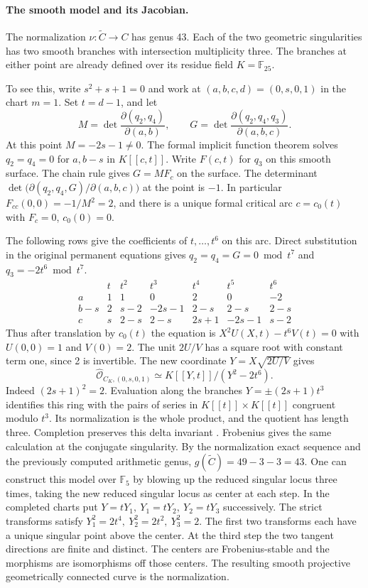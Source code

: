 \paragraph{The smooth model and its Jacobian.}
The normalization \(\nu:\widetilde C\to C\) has genus 43. Each of the
two geometric singularities has two smooth branches with intersection
multiplicity three. The branches at either point are already defined
over its residue field \(K=\mathbb F_{25}\).

To see this, write \(s^2+s+1=0\) and work at
\((a,b,c,d)=(0,s,0,1)\) in the chart \(m=1\). Set \(t=d-1\), and let
\[
 M=\det\frac{\partial(q_2,q_4)}{\partial(a,b)},\qquad
 G=\det\frac{\partial(q_2,q_4,q_3)}{\partial(a,b,c)}.
\]
At this point \(M=-2s-1\ne0\). The formal implicit function theorem
solves \(q_2=q_4=0\) for \(a,b-s\) in \(K[[c,t]]\). Write \(F(c,t)\)
for \(q_3\) on this smooth surface. The chain rule gives \(G=M F_c\)
on the surface. The determinant
\(\det\bigl(\partial(q_2,q_4,G)/\partial(a,b,c)\bigr)\) at the point
is \(-1\). In particular \(F_{cc}(0,0)=-1/M^2=2\), and there is a
unique formal critical arc \(c=c_0(t)\) with \(F_c=0\), \(c_0(0)=0\).

The following rows give the coefficients of \(t,\ldots,t^6\) on this
arc. Direct substitution in the original permanent equations gives
\(q_2=q_4=G=0\bmod t^7\) and \(q_3=-2t^6\bmod t^7\).
\[
\begin{array}{c|rrrrrr}
 & t&t^2&t^3&t^4&t^5&t^6\\ \hline
 a   &1&1&0&2&0&-2\\
 b-s &2&s-2&-2s-1&2-s&2-s&2-s\\
 c   &s&2-s&2-s&2s+1&-2s-1&s-2
\end{array}
\]
Thus after translation by \(c_0(t)\) the equation is
\(X^2U(X,t)-t^6 V(t)=0\) with \(U(0,0)=1\) and \(V(0)=2\).
The unit \(2U/V\) has a square root with constant term one, since
2 is invertible. The new coordinate \(Y=X\sqrt{2U/V}\) gives
\[
        \widehat{\mathcal O}_{C_K,(0,s,0,1)}
                   \simeq K[[Y,t]]/(Y^2-2t^6).
\]
Indeed \((2s+1)^2=2\). Evaluation along the branches
\(Y=\pm(2s+1)t^3\) identifies this ring with the pairs of series in
\(K[[t]]\times K[[t]]\) congruent modulo \(t^3\). Its normalization
is the whole product, and the quotient has length three. Completion
preserves this delta invariant \cite{stacksDeltaCompletion}. Frobenius
gives the same calculation at the conjugate singularity. By the
normalization exact sequence and the previously computed arithmetic
genus, \(g(\widetilde C)=49-3-3=43\). One can construct this model over \(\mathbb F_5\) by blowing up the
reduced singular locus three times, taking the new reduced singular
locus as center at each step. In the completed charts put
\(Y=tY_1,\ Y_1=tY_2,\ Y_2=tY_3\) successively. The strict transforms
satisfy \(Y_1^2=2t^4,\ Y_2^2=2t^2,\ Y_3^2=2\). The first two transforms
each have a unique singular point above the center. At the third step
the two tangent directions are finite and distinct. The centers are
Frobenius-stable and the morphisms are isomorphisms off those centers.
The resulting smooth projective geometrically connected curve is the
normalization.

